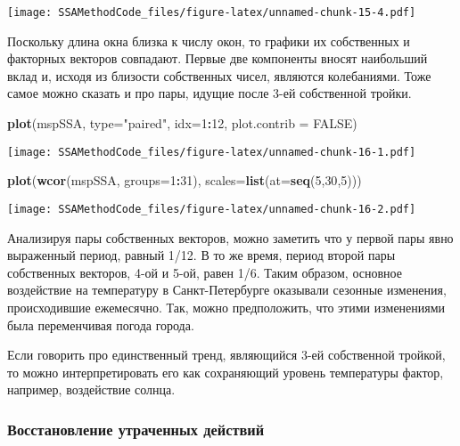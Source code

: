 \documentclass[
]{article}
\newenvironment{Shaded}{\begin{snugshade}}{\end{snugshade}}
\newcommand{\AttributeTok}[1]{\textcolor[rgb]{0.13,0.29,0.53}{#1}}
\newcommand{\ConstantTok}[1]{\textcolor[rgb]{0.56,0.35,0.01}{#1}}
\newcommand{\DecValTok}[1]{\textcolor[rgb]{0.00,0.00,0.81}{#1}}
\newcommand{\FunctionTok}[1]{\textcolor[rgb]{0.13,0.29,0.53}{\textbf{#1}}}
\newcommand{\NormalTok}[1]{#1}
\newcommand{\SpecialCharTok}[1]{\textcolor[rgb]{0.81,0.36,0.00}{\textbf{#1}}}
\newcommand{\StringTok}[1]{\textcolor[rgb]{0.31,0.60,0.02}{#1}}
\begin{document}
\texttt{[image: SSAMethodCode\_files/figure-latex/unnamed-chunk-15-4.pdf]}

Поскольку длина окна близка к числу окон, то графики их собственных и
факторных векторов совпадают. Первые две компоненты вносят наибольший
вклад и, исходя из близости собственных чисел, являются колебаниями.
Тоже самое можно сказать и про пары, идущие после 3-ей собственной
тройки.

\begin{Shaded}
\begin{Highlighting}[]
\FunctionTok{plot}\NormalTok{(mspSSA, }\AttributeTok{type=}\StringTok{"paired"}\NormalTok{, }\AttributeTok{idx=}\DecValTok{1}\SpecialCharTok{:}\DecValTok{12}\NormalTok{, }\AttributeTok{plot.contrib =} \ConstantTok{FALSE}\NormalTok{)}
\end{Highlighting}
\end{Shaded}

\texttt{[image: SSAMethodCode\_files/figure-latex/unnamed-chunk-16-1.pdf]}

\begin{Shaded}
\begin{Highlighting}[]
\FunctionTok{plot}\NormalTok{(}\FunctionTok{wcor}\NormalTok{(mspSSA, }\AttributeTok{groups=}\DecValTok{1}\SpecialCharTok{:}\DecValTok{31}\NormalTok{), }\AttributeTok{scales=}\FunctionTok{list}\NormalTok{(}\AttributeTok{at=}\FunctionTok{seq}\NormalTok{(}\DecValTok{5}\NormalTok{,}\DecValTok{30}\NormalTok{,}\DecValTok{5}\NormalTok{)))}
\end{Highlighting}
\end{Shaded}

\texttt{[image: SSAMethodCode\_files/figure-latex/unnamed-chunk-16-2.pdf]}

Анализируя пары собственных векторов, можно заметить что у первой пары
явно выраженный период, равный 1/12. В то же время, период второй пары
собственных векторов, 4-ой и 5-ой, равен 1/6. Таким образом, основное
воздействие на температуру в Санкт-Петербурге оказывали сезонные
изменения, происходившие ежемесячно. Так, можно предположить, что этими
изменениями была переменчивая погода города.

Если говорить про единственный тренд, являющийся 3-ей собственной
тройкой, то можно интерпретировать его как сохраняющий уровень
температуры фактор, например, воздействие солнца.

\subsubsection{Восстановление утраченных
действий}\label{ux432ux43eux441ux441ux442ux430ux43dux43eux432ux43bux435ux43dux438ux435-ux443ux442ux440ux430ux447ux435ux43dux43dux44bux445-ux434ux435ux439ux441ux442ux432ux438ux439}
\end{document}

